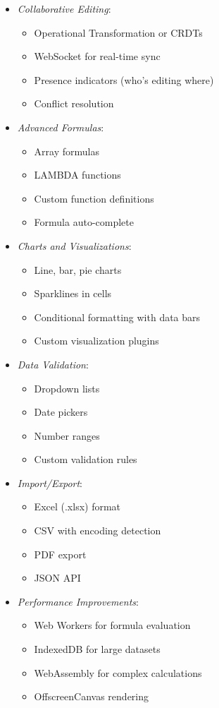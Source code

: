 \documentclass[11pt]{article}
\begin{document}
\begin{itemize}
\item \emph{Collaborative Editing}:
\begin{itemize}
\item Operational Transformation or CRDTs
\item WebSocket for real-time sync
\item Presence indicators (who's editing where)
\item Conflict resolution
\end{itemize}

\item \emph{Advanced Formulas}:
\begin{itemize}
\item Array formulas
\item LAMBDA functions
\item Custom function definitions
\item Formula auto-complete
\end{itemize}

\item \emph{Charts and Visualizations}:
\begin{itemize}
\item Line, bar, pie charts
\item Sparklines in cells
\item Conditional formatting with data bars
\item Custom visualization plugins
\end{itemize}

\item \emph{Data Validation}:
\begin{itemize}
\item Dropdown lists
\item Date pickers
\item Number ranges
\item Custom validation rules
\end{itemize}

\item \emph{Import/Export}:
\begin{itemize}
\item Excel (.xlsx) format
\item CSV with encoding detection
\item PDF export
\item JSON API
\end{itemize}

\item \emph{Performance Improvements}:
\begin{itemize}
\item Web Workers for formula evaluation
\item IndexedDB for large datasets
\item WebAssembly for complex calculations
\item OffscreenCanvas rendering
\end{itemize}


\end{itemize}
\end{document}
